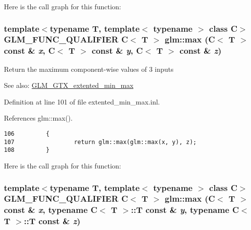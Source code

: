 Here is the call graph for this function:\hypertarget{group__gtx__extented__min__max_g88f52afea5c8c6d5f3197816cc3f9607}{
\subsubsection[max]{\setlength{\rightskip}{0pt plus 5cm}template$<$typename T, template$<$ typename $>$ class C$>$ GLM\_\-FUNC\_\-QUALIFIER C$<$ T $>$ glm::max (C$<$ T $>$ const \& {\em x}, \/  C$<$ T $>$ const \& {\em y}, \/  C$<$ T $>$ const \& {\em z})}}
\label{group__gtx__extented__min__max_g88f52afea5c8c6d5f3197816cc3f9607}


Return the maximum component-wise values of 3 inputs \begin{Desc}
\item[See also:]\hyperlink{group__gtx__extented__min__max}{GLM\_\-GTX\_\-extented\_\-min\_\-max} \end{Desc}


Definition at line 101 of file extented\_\-min\_\-max.inl.

References glm::max().

\begin{Code}\begin{verbatim}106         {
107                 return glm::max(glm::max(x, y), z);
108         }
\end{verbatim}
\end{Code}




Here is the call graph for this function:\hypertarget{group__gtx__extented__min__max_g55d5788e40f5915e95108d2c611fc42e}{
\subsubsection[max]{\setlength{\rightskip}{0pt plus 5cm}template$<$typename T, template$<$ typename $>$ class C$>$ GLM\_\-FUNC\_\-QUALIFIER C$<$ T $>$ glm::max (C$<$ T $>$ const \& {\em x}, \/  typename C$<$ T $>$::T const \& {\em y}, \/  typename C$<$ T $>$::T const \& {\em z})}}
\label{group__gtx__extented__min__max_g55d5788e40f5915e95108d2c611fc42e}


